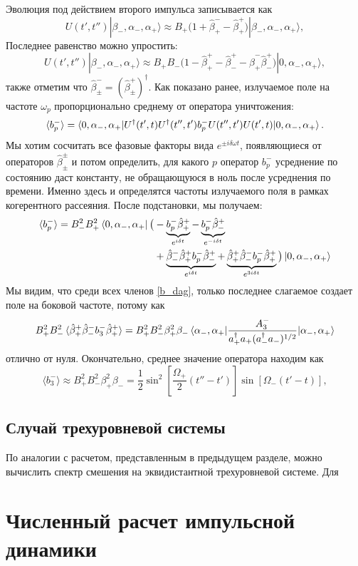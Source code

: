 Эволюция под действием второго импульса записывается как 
\begin{equation}
	U(t',t'') |\beta_-,\alpha_-,\alpha_+\rangle \approx B_+ \bigg(1 + \hat{\beta}^-_+ - \hat{\beta}^+_+\bigg)  |\beta_-,\alpha_-,\alpha_+\rangle, 
	\label{Utt}
\end{equation}
Последнее равенство можно упростить: 
\begin{equation}
	U(t',t'') |\beta_-,\alpha_-,\alpha_+\rangle \approx B_+ B_- \Big(1 - \hat\beta^+_+  - \hat\beta^+_- - \hat\beta^-_+ \hat\beta^+_-\Big)|0,\alpha_-,\alpha_+\rangle, 
\end{equation}
также отметим что $\hat\beta^-_\pm =(\hat\beta^+_\pm)^\dag$. Как показано ранее, излучаемое поле на частоте $\omega_p$ пропорционально среднему от оператора уничтожения:
\begin{equation}
	\braket{b^-_p} = \braket{0,\alpha_-,\alpha_+|U^\dag(t',t)U^\dag(t'',t') b^-_p U(t'',t')U(t',t)|0, \alpha_-, \alpha_+}.
\end{equation}
Мы хотим сосчитать все фазовые факторы вида $e^{\pm i\delta\omega t}$, появляющиеся от операторов $\hat{\beta}^{\pm}_{\pm}$ и потом определить, для какого $p$ оператор $b^-_{p}$ усреднение по состоянию даст константу, не обращающуюся в ноль после усреднения по времени. Именно здесь и определятся частоты излучаемого поля в рамках когерентного рассеяния. После подстановки, мы получаем:
\begin{equation}
	\begin{split}
	\braket{b^-_p} = B_-^2B_+^2\bra{0,\alpha_-,\alpha_+}\big(
		&-\underbrace{b^-_p\hat{\beta}^+_+}_{e^{i\delta t}}
		-\underbrace{b^-_p\hat{\beta}^+_- }_{e^{-i\delta t}} \\
		&+\underbrace{\hat{\beta}^-_- \hat{\beta}^+_+ b^-_p  \hat{\beta}^+_-}_{e^{i\delta t}} 
		+\underbrace{\hat{\beta}^+_+ \hat{\beta}^-_-b^-_p\hat{\beta}^+_+  }_{e^{3i\delta t}}
		\big) \ket{0,\alpha_-,\alpha_+}
	\label{b_dag}
	\end{split}
\end{equation}
Мы видим, что среди всех членов \eqref{b_dag}, только последнее слагаемое создает поле на боковой частоте, потому как
\begin{equation}
	B_+^2 B_-^2\braket{\hat{\beta}^+_+ \hat{\beta}^-_-b^-_3\hat{\beta}^+_+ } = B_+^2 B_-^2\beta^2_+\beta_-\braket{\alpha_-,\alpha_+| \frac{A^-_{3}}{a^\dagger_+ a_+(a^\dagger_- a_-)^{1/2}}|\alpha_-,\alpha_+}
\end{equation}
отлично от нуля. 
Окончательно, среднее значение оператора находим как 
\begin{equation}
	\langle b^-_3 \rangle \approx B_+^2 B_-^2 \beta_+^2\beta_- = \frac{1}{2}\sin^2\left[\frac{\Omega_+}{2} (t''-t')\right]\sin\left[\Omega_- (t'-t)\right],
\end{equation}
\subsection{Случай трехуровневой системы}
По аналогии с расчетом, представленным в предыдущем разделе, можно вычислить спектр смешения на эквидистантной трехуровневой системе. Для 
\section{Численный расчет импульсной динамики}


